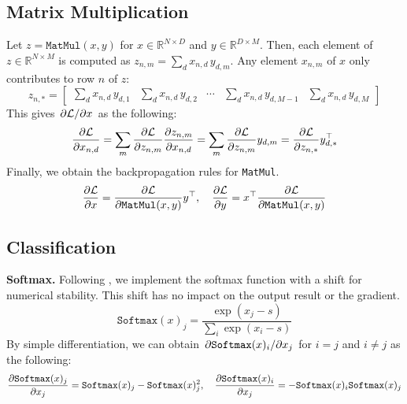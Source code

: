 \documentclass{lucas-report}
\begin{document}
\subsection{Matrix Multiplication}

Let $z = \texttt{MatMul}(x, y)$ for \(x \in \mathbb{R}^{N \times D}\) and \(y \in \mathbb{R}^{D \times M}\).
Then, each element of \(z \in \mathbb{R}^{N \times M}\) is computed as \(z_{n,m} = \sum_d x_{n,d}\,y_{d,m}\).
Any element \(x_{n,m}\) of \(x\) only contributes to row $n$ of \(z\):
\[
  z_{n,*} =
  \begin{bmatrix}
    \sum_d x_{n,d}\,y_{d,1} & \sum_d x_{n,d}\,y_{d,2} & \cdots & \sum_d x_{n,d}\,y_{d,M-1} & \sum_d x_{n,d}\,y_{d,M}
  \end{bmatrix}
\]
This gives \(\pdv{\ensuremath{\mathcal{L}}}/{x}\) as the following:
\[
  \pdv{\ensuremath{\mathcal{L}}}{x_{n,d}} =
  \sum_m \pdv{\ensuremath{\mathcal{L}}}{{z_{n,m}}} \pdv{z_{n,m}}{x_{n,d}} =
  \sum_m \pdv{\ensuremath{\mathcal{L}}}{{z_{n,m}}} y_{d,m} =
  \pdv{\ensuremath{\mathcal{L}}}{{z_{n,*}}} y_{d,*}^\top
\]
Finally, we obtain the backpropagation rules for \texttt{MatMul}.
\[
  \pdv{\ensuremath{\mathcal{L}}}{x} = \pdv{\ensuremath{\mathcal{L}}}{{\texttt{MatMul}(x, y)}} y^\top, \quad
  \pdv{\ensuremath{\mathcal{L}}}{y} = x^\top \pdv{\ensuremath{\mathcal{L}}}{{\texttt{MatMul}(x, y)}}
\]

\subsection{Classification}

\textbf{Softmax.} Following \cite{accurate-softmax}, we implement the softmax function with a shift for numerical stability.
This shift has no impact on the output result or the gradient.
\[
  \texttt{Softmax}(x)_j = \frac{\exp{(x_j - s)}}{\sum_i{\exp{(x_i - s)}}}
\]
By simple differentiation, we can obtain \(\pdv{\texttt{Softmax}(x)_i}/{x_j}\) for $i=j$ and $i\neq j$ as the following:
\[
  \pdv{\texttt{Softmax}(x)_j}{x_j} = \texttt{Softmax}(x)_j - \texttt{Softmax}(x)_j^2,
  \quad \pdv{\texttt{Softmax}(x)_i}{x_j} = - \texttt{Softmax}(x)_i \texttt{Softmax}(x)_j
\]

\end{document}
